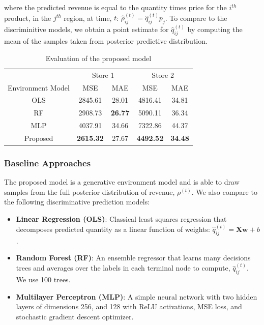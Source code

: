 where the predicted revenue is equal to the quantity times price for the $i^{th}$ product, in the $j^{th}$ region, at time, $t$: $\hat{\rho}^{(t)}_{ij} = \hat{q}^{(t)}_{ij}p_j$. To compare to the discriminitive models, we obtain a point estimate for $\hat{q}^{(t)}_{ij}$ by computing the mean of the samples taken from posterior predictive distribution.




\begin{table}
        \centering
        \caption{Evaluation of the proposed model}
        \label{ppc-results}
        \begin{tabular}{c|c|c|c|c|}
             \cline{2-5}
              & \multicolumn{2}{c}{Store 1} & \multicolumn{2}{c|}{Store 2} \\
              Environment Model & MSE & MAE & MSE & MAE \\
            \hline
             OLS  & 2845.61 & 28.01 & 4816.41  & 34.81 \\
             RF  & 2908.73 & \textbf{26.77} & 5090.11  & 36.34 \\
             MLP  & 4037.91 &  34.66  & 7322.86  & 44.37 \\
             \hline
             Proposed  & \textbf{2615.32} & 27.67 & \textbf{4492.52}  & \textbf{34.48} \\
        \hline
        \end{tabular}
\end{table}


\subsubsection{Baseline Approaches}
The proposed model is a generative environment model and is able to draw samples from the full posterior distribution of revenue, $\rho^{(t)}$.  We also compare to the following discriminative prediction models:
\begin{itemize}
    \item \textbf{Linear Regression (OLS)}: Classical least squares regression that decomposes predicted quantity as a linear function of weights: $\hat{q}^{(t)}_{ij} = \textbf{X} \textbf{w} + b$.
    \item \textbf{Random Forest (RF)}: An ensemble regressor that learns many decisions trees and averages over the labels in each terminal node to compute, $\hat{q}^{(t)}_{ij}$. We use 100 trees.
    \item \textbf{Multilayer Perceptron (MLP)}: A simple neural network with two hidden layers of dimensions 256, and 128 with ReLU activations, MSE loss, and stochastic gradient descent optimizer.
\end{itemize}

